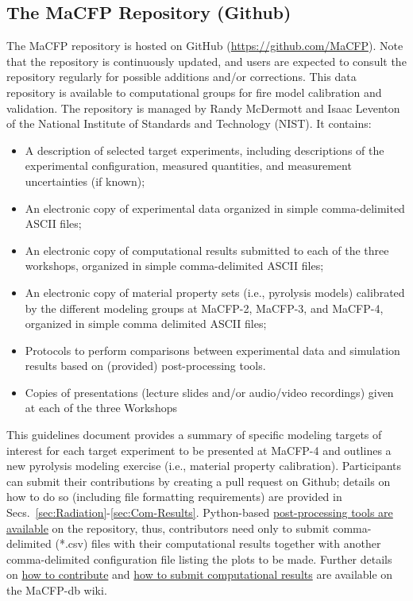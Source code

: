 \documentclass[12pt]{article}
\begin{document}
\subsection{The MaCFP Repository (Github)}
The MaCFP repository is hosted on GitHub (\url{https://github.com/MaCFP}). Note that the repository is continuously updated, and users are expected to consult the repository regularly for possible additions and/or corrections. This data repository is available to computational groups for fire model calibration and validation. The repository is managed by Randy McDermott and Isaac Leventon of the National Institute of Standards and Technology (NIST). It contains:
\begin{itemize}[noitemsep]
 \item A description of selected target experiments, including descriptions of the experimental configuration, measured quantities, and measurement uncertainties (if known);
 \item An electronic copy of experimental data organized in simple comma-delimited ASCII files;
 \item  An electronic copy of computational results submitted to each of the three workshops, organized in simple comma-delimited ASCII files;
  \item An electronic copy of material property sets (i.e., pyrolysis models) calibrated by the different modeling groups at MaCFP-2, MaCFP-3, and MaCFP-4, organized in simple comma delimited ASCII files;
 \item Protocols to perform comparisons between experimental data and simulation results based on (provided) post-processing tools.
 \item Copies of presentations (lecture slides and/or audio/video recordings) given at each of the three Workshops
\end{itemize}

This guidelines document provides a summary of specific modeling targets of interest for each target experiment to be presented at MaCFP-4 and outlines a new pyrolysis modeling exercise (i.e., material property calibration). Participants can submit their contributions by creating a pull request on Github; details on how to do so (including file formatting requirements) are provided in Secs.~\ref{sec:Radiation}-\ref{sec:Com-Results}. Python-based \href{https://github.com/MaCFP/macfp-db/wiki/Plotting-Scripts}{post-processing tools are available} on the repository, thus, contributors need only to submit comma-delimited (*.csv) files with their computational results together with another comma-delimited configuration file listing the plots to be made. Further details on \href{https://github.com/MaCFP/macfp-db/wiki/How-to-Contribute}{how to contribute} and \href{https://github.com/MaCFP/macfp-db/wiki/Submitting-Computational-Results}{how to submit computational results} are available on the MaCFP-db wiki.  %
\end{document}
